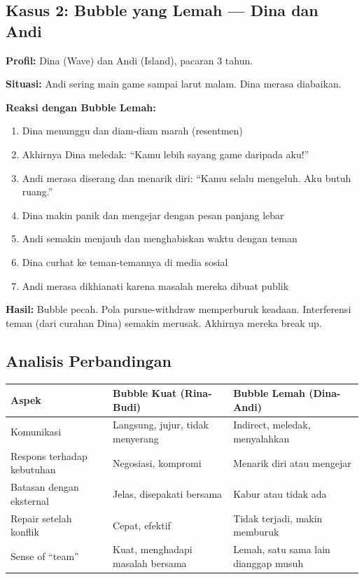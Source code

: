 \subsection{Kasus 2: Bubble yang Lemah --- Dina dan Andi}

\begin{warningbox}
\textbf{Profil:} Dina (Wave) dan Andi (Island), pacaran 3 tahun.

\textbf{Situasi:} Andi sering main game sampai larut malam. Dina merasa diabaikan.

\textbf{Reaksi dengan Bubble Lemah:}
\begin{enumerate}
    \item Dina menunggu dan diam-diam marah (resentmen)
    \item Akhirnya Dina meledak: ``Kamu lebih sayang game daripada aku!''
    \item Andi merasa diserang dan menarik diri: ``Kamu selalu mengeluh. Aku butuh ruang.''
    \item Dina makin panik dan mengejar dengan pesan panjang lebar
    \item Andi semakin menjauh dan menghabiskan waktu dengan teman
    \item Dina curhat ke teman-temannya di media sosial
    \item Andi merasa dikhianati karena masalah mereka dibuat publik
\end{enumerate}

\textbf{Hasil:} Bubble pecah. Pola pursue-withdraw memperburuk keadaan. Interferensi teman (dari curahan Dina) semakin merusak. Akhirnya mereka break up.
\end{warningbox}

\subsection{Analisis Perbandingan}

\begin{center}
\renewcommand{\arraystretch}{1.5}
\begin{tabular}{|>{\raggedright}p{3.5cm}|>{\raggedright}p{5cm}|>{\raggedright\arraybackslash}p{5cm}|}
\hline
\rowcolor{sagegreen!20}
\textbf{Aspek} & \textbf{Bubble Kuat (Rina-Budi)} & \textbf{Bubble Lemah (Dina-Andi)} \\
\hline
Komunikasi & Langsung, jujur, tidak menyerang & Indirect, meledak, menyalahkan \\
\hline
Respons terhadap kebutuhan & Negosiasi, kompromi & Menarik diri atau mengejar \\
\hline
Batasan dengan eksternal & Jelas, disepakati bersama & Kabur atau tidak ada \\
\hline
Repair setelah konflik & Cepat, efektif & Tidak terjadi, makin memburuk \\
\hline
Sense of ``team'' & Kuat, menghadapi masalah bersama & Lemah, satu sama lain dianggap musuh \\
\hline
\end{tabular}
\end{center}

